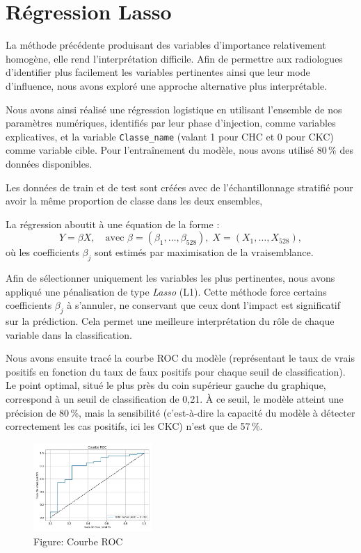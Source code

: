 \chapter{Régression Lasso}
\label{ch:ch4}
La méthode précédente produisant des variables d’importance relativement homogène, elle rend l’interprétation difficile. Afin de permettre aux radiologues d’identifier plus facilement les variables pertinentes ainsi que leur mode d’influence, nous avons exploré une approche alternative plus interprétable.

Nous avons ainsi réalisé une régression logistique en utilisant l’ensemble de nos paramètres numériques, identifiés par leur phase d'injection, comme variables explicatives, et la variable \texttt{Classe\_name} (valant 1 pour CHC et 0 pour CKC) comme variable cible. Pour l'entraînement du modèle, nous avons utilisé 80\,\% des données disponibles.

Les données de train et de test sont créées avec de l’échantillonnage stratifié pour avoir la même proportion de classe dans les deux ensembles,

La régression aboutit à une équation de la forme :
\[
\scriptstyle
Y = \beta X,\quad \text{avec } \beta = (\beta_1, \dots, \beta_{528}), \; X = (X_1, \dots, X_{528}),
\]
où les coefficients $\beta_j$ sont estimés par maximisation de la vraisemblance.

Afin de sélectionner uniquement les variables les plus pertinentes, nous avons appliqué une pénalisation de type \textit{Lasso} (L1). Cette méthode force certains coefficients $\beta_j$ à s’annuler, ne conservant que ceux dont l’impact est significatif sur la prédiction. Cela permet une meilleure interprétation du rôle de chaque variable dans la classification.

Nous avons ensuite tracé la courbe ROC du modèle (représentant le taux de vrais positifs en fonction du taux de faux positifs pour chaque seuil de classification). Le point optimal, situé le plus près du coin supérieur gauche du graphique, correspond à un seuil de classification de 0{,}21. À ce seuil, le modèle atteint une précision de 80\,\%, mais la sensibilité (c’est-à-dire la capacité du modèle à détecter correctement les cas positifs, ici les CKC) n’est que de 57\,\%.

\begin{figure}[H]
    \centering
    \includegraphics[width=0.4\textwidth]{img/roc.jpg}
    \caption{Figure: Courbe ROC}
\end{figure}


